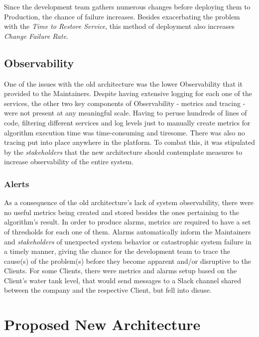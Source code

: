 Since the development team gathers numerous changes before deploying them to Production, the chance of failure increases. Besides exacerbating the problem with the \textit{Time to Restore Service}, this method of deployment also increases \textit{Change Failure Rate}.



\subsection{Observability}\label{methodology:ss:observability}

One of the issues with the old architecture was the lower Observability that it provided to the Maintainers. Despite having extensive logging for each one of the services, the other two key components of Observability - metrics and tracing - were not present at any meaningful scale. Having to peruse hundreds of lines of code, filtering different services and log levels just to manually create metrics for algorithm execution time was time-consuming and tiresome. There was also no tracing put into place anywhere in the platform. To combat this, it was stipulated by the \textit{stakeholders} that the new architecture should contemplate measures to increase observability of the entire system.

\subsubsection{Alerts}\label{methodology:sss:alerts}
As a consequence of the old architecture's lack of system observability, there were no useful metrics being created and stored besides the ones pertaining to the algorithm's result. In order to produce alarms, metrics are required to have a set of thresholds for each one of them. Alarms automatically inform the Maintainers and \textit{stakeholders} of unexpected system behavior or catastrophic system failure in a timely manner, giving the chance for the development team to trace the cause(s) of the problem(s) before they become apparent and/or disruptive to the Clients. For some Clients, there were metrics and alarms setup based on the Client's water tank level, that would send messages to a Slack channel shared between the company and the respective Client, but fell into disuse.


\section{Proposed New Architecture}\label{methodology:s:proposed-new-architecture}

